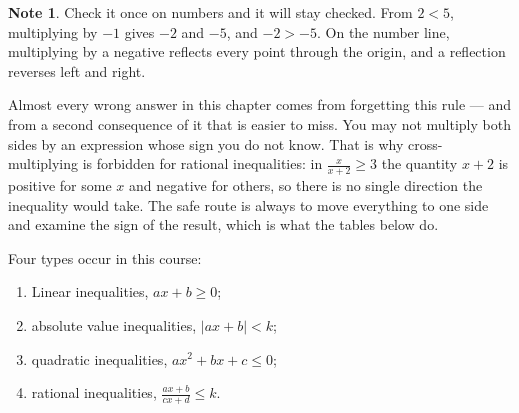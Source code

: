 \documentclass[11pt,a4paper]{article}
\theoremstyle{definition}
\newtheorem{note}[thm]{Note}
\begin{document}
\begin{note}
Check it once on numbers and it will stay checked. From $2<5$, multiplying by $-1$
gives $-2$ and $-5$, and $-2>-5$. On the number line, multiplying by a negative
reflects every point through the origin, and a reflection reverses left and right.

Almost every wrong answer in this chapter comes from forgetting this rule --- and
from a second consequence of it that is easier to miss. You may not multiply both
sides by an expression whose sign you do not know. That is why cross-multiplying is
forbidden for rational inequalities: in $\frac{x}{x+2}\geq 3$ the quantity $x+2$ is
positive for some $x$ and negative for others, so there is no single direction the
inequality would take. The safe route is always to move everything to one side and
examine the sign of the result, which is what the tables below do.
\end{note}

Four types occur in this course:
\begin{enumerate}
\item Linear inequalities, $ax+b\geq 0$;
\item absolute value inequalities, $\left|ax+b\right|<k$;
\item quadratic inequalities, $ax^{2}+bx+c\leq 0$;
\item rational inequalities, $\frac{ax+b}{cx+d}\leq k$.
\end{enumerate}
\end{document}
